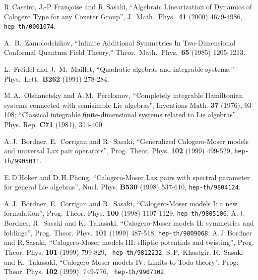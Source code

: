 \documentclass[a4paper,12pt]{article}
\begin{document}
\begin{thebibliography}{99}

R.\,Caseiro, J.-P.\,Fran\c{c}oise and R.\,Sasaki,
``Algebraic Linearization of Dynamics of Calogero Type for any
Coxeter Group'',
J.\ Math.\ Phys.\ {\bf 41} (2000) 4679-4986,
{\tt hep-th/0001074}.


A.~B.~Zamolodchikov,
``Infinite Additional Symmetries In Two-Dimensional
Conformal Quantum Field
Theory,''
Theor.\ Math.\ Phys.\ {\bf 65} (1985) 1205-1213.


L.~Freidel and J.~M.~Maillet,
``Quadratic algebras and integrable systems,''
Phys.\ Lett.\ {\bf B262} (1991) 278-284.


 M.\,A.\, Olshanetsky and A.\,M.\, Perelomov,
``Completely integrable Hamiltonian systems connected with
 semisimple Lie algebras",
 Inventions Math. {\bf 37} (1976), 93-108;
 ``Classical integrable finite-dimensional systems related to Lie
 algebras'',
 Phys. Rep.  {\bf C71} (1981), 314-400.

   A.\,J.\, Bordner, E.\, Corrigan and R.\, Sasaki,
``Generalized Calogero-Moser models and  universal Lax pair operators'',
 Prog. Theor. Phys. {\bf 102}  (1999)  499-529,
 {\tt  hep-th/9905011}.

E.\,D'Hoker and D.\,H.\,Phong, ``Calogero-Moser
Lax pairs with spectral parameter for general Lie algebras'',
Nucl. Phys. {\bf B530} (1998) 537-610, {\tt hep-th/9804124}.




 A.\,J.\, Bordner, E.\, Corrigan and R.\, Sasaki,
``Calogero-Moser models I: a new formulation'',
Prog. Theor. Phys. {\bf 100} (1998) 1107-1129, {\tt hep-th/9805106};
A.\,J.\, Bordner,   R.\,
Sasaki and K.\, Takasaki, ``Calogero-Moser models II:
symmetries and foldings'', Prog. Theor. Phys. {\bf
101} (1999) 487-518, {\tt hep-th/9809068};
A.\,J.\,Bordner and R.\,Sasaki, ``Calogero-Moser models III: elliptic
potentials and
twisting'', Prog. Theor. Phys. {\bf 101} (1999) 799-829, {\tt
hep-th/9812232};
S.\,P.\, Khastgir, R.\, Sasaki and K.\, Takasaki,
``Calogero-Moser models IV: Limits to Toda theory",
 Prog. Theor. Phys. {\bf 102}  (1999), 749-776, {\tt
hep-th/9907102}.



\end{thebibliography}
\end{document}
